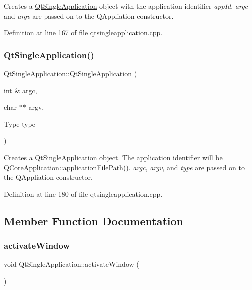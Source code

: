 Creates a \hyperlink{class_qt_single_application}{Qt\+Single\+Application} object with the application identifier {\itshape app\+Id}. {\itshape argc} and {\itshape argv} are passed on to the Q\+Appliation constructor. 

Definition at line 167 of file qtsingleapplication.\+cpp.

\mbox{\label{class_qt_single_application_adcb7a28eec3eef34c6474fb419509895}} 
\subsubsection{\texorpdfstring{Qt\+Single\+Application()}{QtSingleApplication()}\hspace{0.1cm}{\footnotesize\ttfamily [3/3]}}
{\footnotesize\ttfamily Qt\+Single\+Application\+::\+Qt\+Single\+Application (\begin{DoxyParamCaption}\item[{int \&}]{argc,  }\item[{char $\ast$$\ast$}]{argv,  }\item[{Type}]{type }\end{DoxyParamCaption})}

Creates a \hyperlink{class_qt_single_application}{Qt\+Single\+Application} object. The application identifier will be Q\+Core\+Application\+::application\+File\+Path(). {\itshape argc}, {\itshape argv}, and {\itshape type} are passed on to the Q\+Appliation constructor. 

Definition at line 180 of file qtsingleapplication.\+cpp.



\subsection{Member Function Documentation}
\mbox{\label{class_qt_single_application_a0881b32c76132b499f3180064006abc1}} 
\subsubsection{\texorpdfstring{activate\+Window}{activateWindow}}
{\footnotesize\ttfamily void Qt\+Single\+Application\+::activate\+Window (\begin{DoxyParamCaption}{ }\end{DoxyParamCaption})\hspace{0.3cm}{\ttfamily [slot]}}

